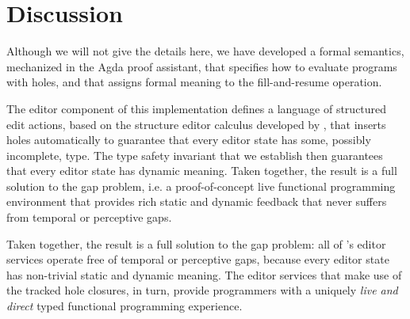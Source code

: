 \section{Discussion}
Although we will not give the details here, we have developed a formal semantics,
mechanized in the Agda proof assistant, that
specifies how to evaluate programs with holes, and that assigns formal meaning to the fill-and-resume operation.

The editor component of this implementation defines a language of structured edit actions, 
based on the \Hazelnut structure editor calculus developed by \citet{popl-paper}, that inserts holes automatically to guarantee that
every editor state has some, possibly incomplete, type. 
The type safety invariant that we establish then guarantees that every editor state has dynamic meaning. Taken together, the result is a full solution to the gap problem, i.e. a proof-of-concept
live functional programming environment that provides rich static and dynamic feedback that never suffers from temporal or perceptive gaps.


Taken together, the result is a full solution to the gap problem: all of \Hazel's
editor services operate free of temporal or perceptive gaps, because every editor state
has non-trivial static and dynamic meaning. The editor services that make use of the 
tracked hole closures, in turn, provide \Hazel programmers with a uniquely 
\emph{live and direct} typed functional programming experience. 
